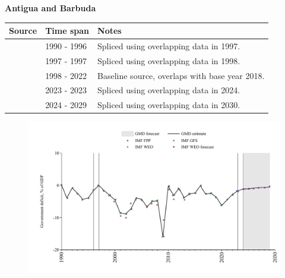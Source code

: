 \documentclass[12pt,a4paper,landscape]{article}
\begin{document}
\begin{adjustbox}{max totalsize={\paperwidth}{\paperheight},center}
\begin{minipage}[t][\textheight][t]{\textwidth}
\vspace*{0.5cm}
{}
\begin{center}
{\Large\bfseries Antigua and Barbuda}
\end{center}
\vspace{0.5cm}
\begin{table}[H]
\centering
\small
\begin{tabular}{|l|l|l|}
\hline
\textbf{Source} & \textbf{Time span} & \textbf{Notes} \\
\hline
\rowcolor{white}\cite{IMF_WEO}& 1990 - 1996 &Spliced using overlapping data in 1997.\\
\rowcolor{lightgray}\cite{IMF_FPP}& 1997 - 1997 &Spliced using overlapping data in 1998.\\
\rowcolor{white}\cite{IMF_WEO}& 1998 - 2022 &Baseline source, overlaps with base year 2018.\\
\rowcolor{lightgray}\cite{IMF_FPP}& 2023 - 2023 &Spliced using overlapping data in 2024.\\
\rowcolor{white}\cite{IMF_WEO_forecast}& 2024 - 2029 &Spliced using overlapping data in 2030.\\
\hline
\end{tabular}
\end{table}
\begin{figure}[H]
\centering
\includegraphics[width=\textwidth,height=0.6\textheight,keepaspectratio]{graphs/ATG_govdef_GDP.pdf}
\end{figure}
\end{minipage}
\end{adjustbox}
\end{document}
